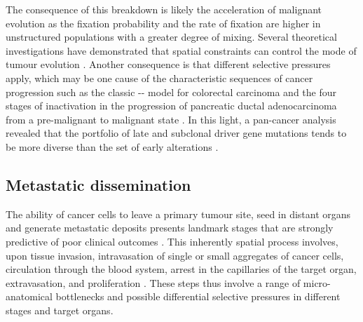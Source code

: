 The consequence of this breakdown is likely the acceleration of malignant evolution as the fixation probability and the rate of fixation are higher in unstructured populations with a greater degree of mixing. Several theoretical investigations have demonstrated that spatial constraints can control the mode of tumour evolution \parencite{West2021-ar,Noble2022-eg}. Another consequence is that different selective pressures apply, which may be one cause of the characteristic sequences of cancer progression such as the classic -- model for colorectal carcinoma \parencite{Fearon1990-el,Gerstung2020-sg} and the four stages of  inactivation in the progression of pancreatic ductal adenocarcinoma from a pre-malignant to malignant state \parencite{Baslan2022-rb}. In this light, a pan-cancer analysis revealed that the portfolio of late and subclonal driver gene mutations tends to be more diverse than the set of early alterations \parencite{Gerstung2020-sg}.

\subsection*{Metastatic dissemination}
\label{sec:intro-metastasis}
The ability of cancer cells to leave a primary tumour site, seed in distant organs and generate metastatic deposits presents landmark stages that are strongly predictive of poor clinical outcomes \parencite{Lambert2017-ll}. This inherently spatial process involves, upon tissue invasion, intravasation of single or small aggregates of cancer cells, circulation through the blood system, arrest in the capillaries of the target organ, extravasation, and proliferation \parencite{Fidler2003-lh} . These steps thus involve a range of micro-anatomical bottlenecks and possible differential selective pressures in different stages and target organs.

